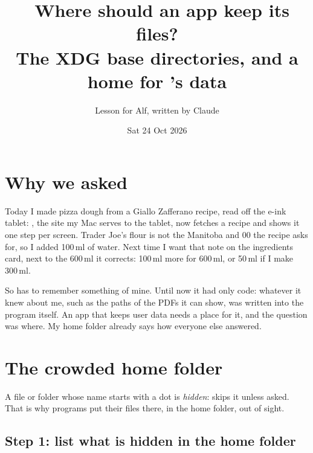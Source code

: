 \documentclass[11pt,a4paper]{article}
\title{\emo{file folder}\ Where should an app keep its files?\\[0.3em]
  \large The XDG base directories, and a home for \name{eink}'s data}
\author{Lesson for Alf, written by Claude}
\date{Sat 24 Oct 2026}
\begin{document}
\maketitle

\section*{Why we asked}

Today I made pizza dough from a Giallo Zafferano recipe, read off the e-ink tablet: , the site my Mac serves to the tablet, now fetches a recipe and shows it one step per screen. Trader Joe's flour is not the Manitoba and 00 the recipe asks for, so I added 100\,ml of water. Next time I want that note on the ingredients card, next to the 600\,ml it corrects\here[600 ml, or 50 ml for 300]: 100\,ml more for 600\,ml, or 50\,ml if I make 300\,ml.

So  has to remember something of mine. Until now it had only code: whatever it knew about me, such as the paths of the PDFs it can show, was written into the program itself. An app that keeps user data needs a place for it, and the question was where. My home folder already says how everyone else answered.

\section{The crowded home folder}

A file or folder whose name starts with a dot is \emph{hidden}:  skips it unless asked. That is why programs put their files there, in the home folder, out of sight.

\subsection*{Step 1: list what is hidden in the home folder}
\end{document}
